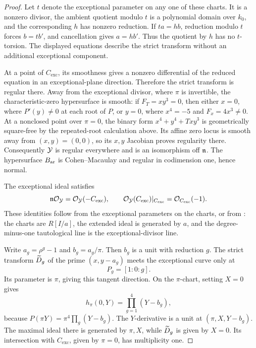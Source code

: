 \begin{proof}
Let \(t\) denote the exceptional parameter on any one of these charts.
It is a nonzero divisor, the ambient quotient modulo \(t\) is a
polynomial domain over \(k_0\), and the corresponding \(h\) has
nonzero reduction. If \(ta=hb\), reduction modulo \(t\) forces
\(b=tb'\), and cancellation gives \(a=hb'\).
Thus the quotient by \(h\) has no \(t\)-torsion.
The displayed equations describe the strict transform without an
additional exceptional component.

At a point of \(C_{\mathrm{exc}}\), its smoothness gives a nonzero
differential of the reduced equation in an exceptional-plane
direction. Therefore the strict transform is regular there.
Away from the exceptional divisor, where \(\pi\) is invertible, the
characteristic-zero hypersurface is smooth: if
\(F_T=xy^3=0\), then either \(x=0\), where \(P'(y)\ne0\) at each
root of \(P\), or \(y=0\), where \(x^4=-5\) and
\(F_x=4x^3\ne0\).
At a nonclosed point over \(\pi=0\), the binary form
\(x^4+y^4+Txy^3\) is geometrically square-free by the repeated-root
calculation above. Its affine zero locus is smooth away from
\((x,y)=(0,0)\), so its \(x,y\) Jacobian proves regularity there.
Consequently \(\mathcal Y\) is regular everywhere and is an isomorphism off
\(\mathfrak n\). The hypersurface \(B_{\mathrm{ar}}\) is Cohen--Macaulay and regular
in codimension one, hence normal.

The exceptional ideal satisfies
\[
 \mathfrak n\mathcal O_{\mathcal Y}=\mathcal O_{\mathcal Y}(-C_{\mathrm{exc}}),
 \qquad
 \mathcal O_{\mathcal Y}(C_{\mathrm{exc}})|_{C_{\mathrm{exc}}}
       =\mathcal O_{C_{\mathrm{exc}}}(-1).
\]
These identities follow from the exceptional parameters on the charts,
or from \cite[Lemmas~31.33.2 and~31.33.4, Tags~0804 and~02OS]{StacksBlowup}:
the charts are \(R[I/a]\), the extended ideal is generated by \(a\),
and the degree-minus-one tautological line is the exceptional-divisor
line.

Write \(a_g=\rho^g-1\) and \(b_g=a_g/\pi\).
Then \(b_g\) is a unit with reduction \(g\).
The strict transform \(\widetilde D_g\) of the prime
\((x,y-a_g)\) meets the exceptional curve only at
\[
 P_g=[1:0:g].
\]
Its parameter is \(\pi\), giving this tangent direction.
On the \(\pi\)-chart, setting \(X=0\) gives
\[
 h_\pi(0,Y)=\prod_{g=1}^4(Y-b_g),
\]
because \(P(\pi Y)=\pi^4\prod_g(Y-b_g)\).
The \(Y\)-derivative is a unit at
\((\pi,X,Y-b_g)\).
The maximal ideal there is generated by \(\pi,X\), while
\(\widetilde D_g\) is given by \(X=0\).
Its intersection with \(C_{\mathrm{exc}}\), given by \(\pi=0\),
has multiplicity one.


\end{proof}
